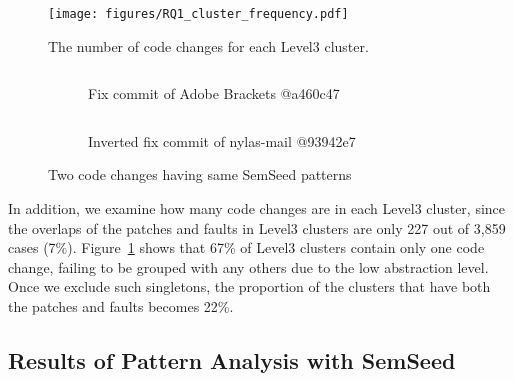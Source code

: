 \documentclass[conference]{IEEEtran}
\begin{document}
\begin{figure}[!t]
    \texttt{[image: figures/RQ1\_cluster\_frequency.pdf]}
    \caption{The number of code changes for each Level3 cluster.}
    \label{fig:RQ1_cluster_frequency}
\end{figure}

\begin{figure}[!ht]
    \begin{subfigure}{\linewidth}
        \centering
        \inputminted[escapeinside=||]{diff}{figures/diff/semseed_example_1.diff}
        \caption{Fix commit of Adobe Brackets @a460c47}
        \label{fig:RQ1_semseed_example_a}
        \vspace{1em}
    \end{subfigure}
    \begin{subfigure}{\linewidth}
        \centering
        \inputminted[escapeinside=||]{diff}{figures/diff/semseed_example_2.diff}
        \caption{Inverted fix commit of nylas-mail @93942e7}
        \label{fig:RQ1_semseed_example_b}
    \end{subfigure}

    \caption{Two code changes having same SemSeed patterns}
    \label{fig:RQ1_semseed_example}
\end{figure}


In addition, we examine how many code changes are in each Level3 cluster,
since the overlaps of the patches and faults in Level3 clusters are only 227 
out of 3,859 cases (7\%). Figure~\ref{fig:RQ1_cluster_frequency} shows that 67\%
of Level3 clusters contain only one code change, failing to be grouped with any 
others due to the low abstraction level. Once we exclude such singletons, the 
proportion of the clusters that have both the patches and faults becomes 
22\%.



\subsection{Results of Pattern Analysis with SemSeed}
\label{sec:RQ1_results_2}
\end{document}
